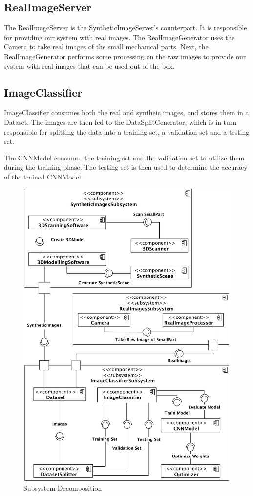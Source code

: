 \documentclass[a4paper,12pt,twoside]{report}
\begin{document}
\subsection{RealImageServer}
The RealImageServer is the SyntheticImageServer's counterpart. It is responsible for providing our system with real images. The RealImageGenerator uses the Camera to take real images of the small mechanical parts. Next, the RealImageGenerator performs some processing on the raw images to provide our system with real images that can be used out of the box.

\subsection{ImageClassifier}
ImageClassifier consumes both the real and syntheic images, and stores them in a Dataset. The images are then fed to the DataSplitGenerator, which is in turn responsible for splitting the data into a training set, a validation set and a testing set.

The CNNModel consumes the training set and the validation set to utilize them during the training phase. The testing set is then used to determine the accuracy of the trained CNNModel.

\begin{figure}[H]
\centering
  \includegraphics[width=\textwidth]{SSD}
\caption{Subsystem Decomposition}
\label{fig:SSD}
\end{figure}
\end{document}
